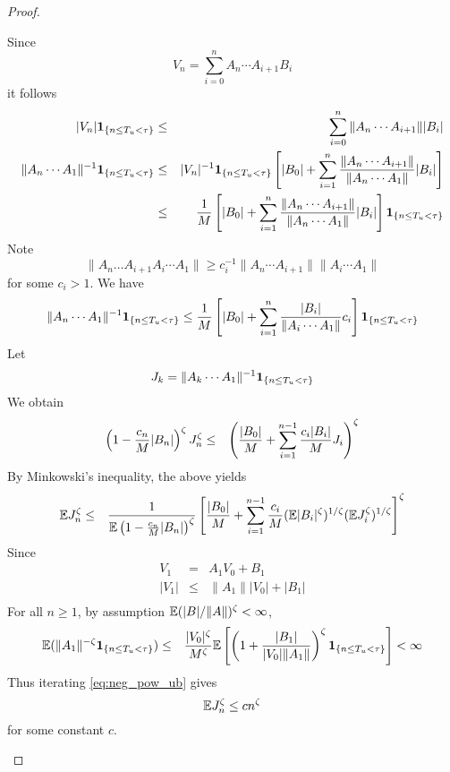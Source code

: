 \documentclass{article}
\theoremstyle{remark}
\begin{document}
\begin{proof}
\begin{enumerate}
    Since
    \[
    V_n = \sum_{i=0}^n A_n \cdots A_{i+1} B_i
    \]
    it follows
    \begin{eqnarray*}
      |V_n|\mathbf{1}_{\{n \leq T_u < \tau\}} &\leq&
      \sum_{i=0}^{n} \|A_n \cdots A_{i+1}\| |B_i| \\
      \|A_n \cdots A_1\|^{-1} \mathbf{1}_{\{n \leq T_u < \tau\}}
      &\leq& |V_n|^{-1} \mathbf{1}_{\{n \leq T_u < \tau\}}
      \left[
        |B_0| + \sum_{i=1}^n {
          \|A_n \cdots A_{i+1}\|
          \over
          \|A_n \cdots A_{1}\|
        } |B_i|
      \right] \\
      &\leq& {1 \over M}
      \left[
        |B_0| + \sum_{i=1}^n {
          \|A_n \cdots A_{i+1}\|
          \over
          \|A_n \cdots A_{1}\|
        } |B_i|
      \right] \mathbf{1}_{\{n \leq T_u < \tau\}}
    \end{eqnarray*}
    Note
    \[
    \|A_n \dots A_{i+1} A_i \cdots A_1\| \geq
    c_i^{-1} \|A_n \cdots A_{i+1}\|
    \|A_i \cdots A_{1}\|
    \]
    for some $c_i > 1$. We have
    \[
    \|A_n \cdots A_1\|^{-1} \mathbf{1}_{\{n \leq T_u < \tau\}}
    \leq
    {1 \over M} \left[
      |B_0| + \sum_{i=1}^n {
        |B_i|
        \over
        \|A_i \cdots A_1\|
      } c_i
    \right] \mathbf{1}_{\{n \leq T_u < \tau\}}
    \]
    Let
    \[
    J_k = \|A_k \cdots A_1\|^{-1} \mathbf{1}_{\{n \leq T_u < \tau\}}
    \]
    We obtain
    \begin{eqnarray*}
      \left(
        1 - {c_n \over M} |B_n|
      \right)^\zeta J_n^\zeta
      &\leq&
      \left(
        {|B_0| \over M} + \sum_{i=1}^{n-1} {c_i |B_i| \over M} J_i
      \right)^\zeta
    \end{eqnarray*}
    By Minkowski's inequality, the above yields
    \begin{eqnarray}
      \mathbb{E} J_n^\zeta &\leq&
      {
        1 \over
        \mathbb{E} \left(
          1 - {c_n \over M} |B_n|
        \right)^\zeta
      }
      \left[
        {|B_0| \over M}
        +
        \sum_{i=1}^{n-1} {c_i \over M}
        (\mathbb{E} |B_i|^\zeta)^{1/\zeta}
        (\mathbb{E} J_i^\zeta)^{1/\zeta}
      \right]^\zeta \label{eq:neg_pow_ub}
    \end{eqnarray}
    Since
    \begin{eqnarray*}
      V_1 &=& A_1 V_0 + B_1 \\
      |V_1| &\leq& \|A_1\| |V_0| + |B_1| \\
      \end{eqnarray*}
      For all $n \geq 1$, by assumption $\mathbb{E} (|B|/\|A\|)^\zeta < \infty$,
      \begin{eqnarray*}
      \mathbb{E} (\|A_1\|^{-\zeta}\mathbf{1}_{\{n\leq T_u < \tau\}})
      &\leq&
      {|V_0|^\zeta \over M^\zeta} \mathbb{E} \left[\left(
        1 + {|B_1| \over |V_0| \|A_1\|}
      \right)^\zeta \mathbf{1}_{\{n\leq T_u < \tau\}}\right] < \infty
    \end{eqnarray*}
    Thus iterating \eqref{eq:neg_pow_ub} gives
    \[
    \mathbb{E} J_n^\zeta \leq cn^\zeta
    \]
    for some constant $c$.


\end{enumerate}
\end{proof}
\end{document}
